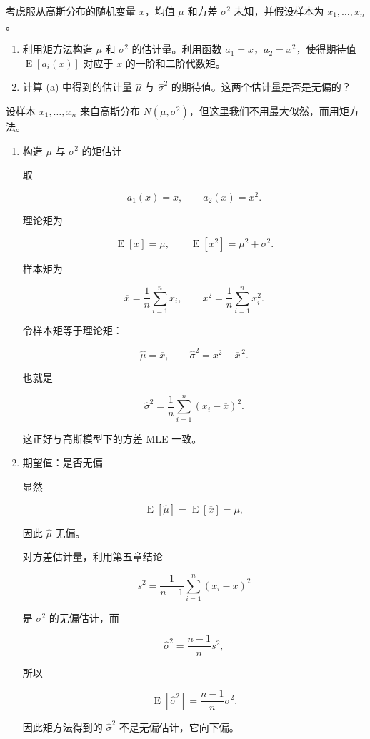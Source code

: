 ﻿


\begin{question}
考虑服从高斯分布的随机变量 \(x\)，均值 \(\mu\) 和方差 \(\sigma^2\)
未知，并假设样本为 \(x_1,\ldots,x_n\)。

\begin{enumerate}
\item
  利用矩方法构造 \(\mu\) 和 \(\sigma^2\) 的估计量。利用函数
  \(a_1=x\)，\(a_2=x^2\)，使得期待值 \(\operatorname{E}[a_i(x)]\) 对应于 \(x\)
  的一阶和二阶代数矩。
\item
  计算 (a) 中得到的估计量 \(\hat\mu\) 与 \(\hat\sigma^2\)
  的期待值。这两个估计量是否是无偏的？
\end{enumerate}
\begin{solution}
设样本 \(x_1,\dots,x_n\) 来自高斯分布
\(N(\mu,\sigma^2)\)，但这里我们不用最大似然，而用矩方法。

\begin{enumerate}
\item 构造 \(\mu\) 与 \(\sigma^2\) 的矩估计

取

\[
a_1(x)=x,
\qquad
a_2(x)=x^2.
\]

理论矩为

\[
\operatorname{E}[x]=\mu,
\qquad \operatorname{E}[x^2]=\mu^2+\sigma^2.
\]

样本矩为

\[
\overline x=\frac1n\sum_{i=1}^n x_i,
\qquad
\overline{x^2}=\frac1n\sum_{i=1}^n x_i^2.
\]

令样本矩等于理论矩：

\[
\hat\mu=\overline x,
\qquad
\hat\sigma^2=\overline{x^2}-\overline x^{\,2}.
\]

也就是

\[
\hat\sigma^2=\frac1n\sum_{i=1}^n (x_i-\overline x)^2.
\]

这正好与高斯模型下的方差 MLE 一致。

\item 期望值：是否无偏

显然

\[
\operatorname{E}[\hat\mu]=\operatorname{E}[\overline x]=\mu,
\]

因此 \(\hat\mu\) 无偏。

对方差估计量，利用第五章结论

\[
s^2=\frac1{n-1}\sum_{i=1}^n (x_i-\overline x)^2
\]

是 \(\sigma^2\) 的无偏估计，而

\[
\hat\sigma^2=\frac{n-1}{n}s^2,
\]

所以

\[
\operatorname{E}[\hat\sigma^2]=\frac{n-1}{n}\sigma^2.
\]

因此矩方法得到的 \(\hat\sigma^2\) 不是无偏估计，它向下偏。
\end{enumerate}
\end{solution}
\end{question}


